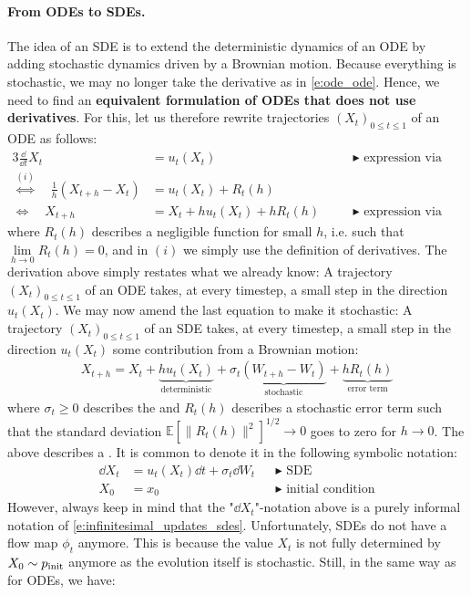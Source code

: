 \paragraph{From ODEs to SDEs.} The idea of an SDE is to extend the deterministic dynamics of an ODE by adding stochastic dynamics driven by a Brownian motion. Because everything is stochastic, we may no longer take the derivative as in \cref{e:ode_ode}. Hence, we need to find an \textbf{equivalent formulation of ODEs that does not use derivatives}. For this, let us therefore rewrite trajectories $(X_t)_{0\leq t\leq 1}$ of an ODE as follows:
\begin{alignat*}{3}
    \frac{\dd}{\dd t} X_t &=  u_t(X_t) \quad &&\blacktriangleright\,\,\text{expression via derivatives}\\
    \overset{(i)}{\Leftrightarrow} \quad  \frac{1}{h}\left(X_{t+h}-X_{t}\right)&=u_t(X_t) + R_t(h)&&\\
\Leftrightarrow \quad X_{t+h} &= X_{t}+hu_t(X_t) + hR_t(h)\quad &&\blacktriangleright\,\,\text{expression via infinitesimal updates}
\end{alignat*}
where  $R_t(h)$ describes a negligible function for small $h$, i.e. such that $\lim\limits_{h\to 0}R_t(h)=0$, and in $(i)$ we simply use the definition of derivatives. The derivation above simply restates what we already know: A trajectory $(X_t)_{0 \le t \le 1}$ of an ODE takes, at every timestep, a small step in the direction $u_t(X_t)$. We may now amend the last equation to make it stochastic: A trajectory $(X_t)_{0 \le t \le 1}$ of an SDE takes, at every timestep, a small step in the direction $u_t(X_t)$  some contribution from a Brownian motion:
\begin{align}
    \label{e:infinitesimal_updates_sdes}
    X_{t+h} = X_{t}+\underbrace{hu_t(X_t)}_{\text{deterministic}} + \sigma_t\underbrace{(W_{t+h}-W_{t})}_{\text{stochastic}}+\underbrace{hR_t(h)}_{\text{error term}}
\end{align}
where $\sigma_t\geq 0$ describes the  and $R_t(h)$ describes a stochastic error term such that the standard deviation $\mathbb{E}[\|R_t(h)\|^2]^{1/2}\to 0$ goes to zero for $h\to 0$. The above describes a . It is common to denote it in the following symbolic notation:
\begin{subequations}\label{e:sde_generic}
    \begin{align} 
      \dd X_t &= u_t(X_t)\dd t + \sigma_t\dd W_t &&\blacktriangleright\,\,\text{SDE}\\
      X_0 &= x_0               &&\blacktriangleright\,\,\text{initial condition}
    \end{align}
\end{subequations}
However, always keep in mind that the "$\dd X_t$"-notation above is a purely informal notation of \cref{e:infinitesimal_updates_sdes}. Unfortunately, SDEs do not have a flow map $\phi_t$ anymore. This is because the value $X_t$ is not fully determined by $X_0\sim p_{\rm{init}}$ anymore as the evolution itself is stochastic. Still, in the same way as for ODEs, we have:

